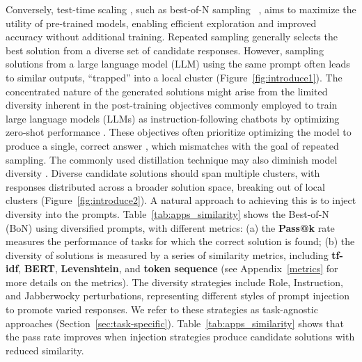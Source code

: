 Conversely, test-time scaling \citep{zeng2024scaling, wu2024inferencescalinglawsempirical, nori2024medprompto1explorationruntime, snell2024scaling, brown2024large, gandhi2024stream, anonymous2025scaling, lee2025evolvingdeeperllmthinking,  anonymous2025planning}, such as best-of-N sampling ~\citep{cobbe2021training, lightman2023let}, aims to maximize the utility of pre-trained models, enabling efficient exploration and improved accuracy without additional training. Repeated sampling generally selects the best solution from a diverse set of candidate responses. However, sampling solutions from a large language model (LLM) using the same prompt often leads to similar outputs, “trapped” into a local cluster (Figure~\ref{fig:introduce1}). The concentrated nature of the generated solutions might arise from the limited diversity inherent in the post-training objectives commonly employed to train large language models (LLMs) as instruction-following chatbots by optimizing zero-shot performance \citep{xiang20252reasoningllmslearning}. These objectives often prioritize optimizing the model to produce a single, correct
answer \citep{xiang20252reasoningllmslearning}, which mismatches with the goal of repeated sampling. The commonly used distillation technique may also diminish model diversity \citep{cideron2024diversityrewardedcfgdistillation, deepseekai2025deepseekr1incentivizingreasoningcapability}.
Diverse candidate solutions should span multiple clusters, with responses distributed across a broader solution space, breaking out of local clusters (Figure~\ref{fig:introduce2}). A natural approach to achieving this is to inject diversity into the prompts. 
Table~\ref{tab:apps_similarity} shows the Best-of-N (BoN) using diversified prompts, with different metrics: (a) the \textbf{Pass@k} rate measures the performance of tasks for which the correct solution is found; (b) the diversity of solutions is measured by a series of similarity metrics, including \textbf{tf-idf}, \textbf{BERT}, \textbf{Levenshtein}, and \textbf{token sequence} (see Appendix~\ref{metrics} for more details on the metrics).
The diversity strategies include Role, Instruction, and Jabberwocky perturbations, representing different styles of prompt injection to promote varied responses. We refer to these strategies as task-agnostic approaches (Section~\ref{sec:task-specific}). Table~\ref{tab:apps_similarity}  shows that the pass rate improves when injection strategies produce candidate solutions with reduced similarity.
